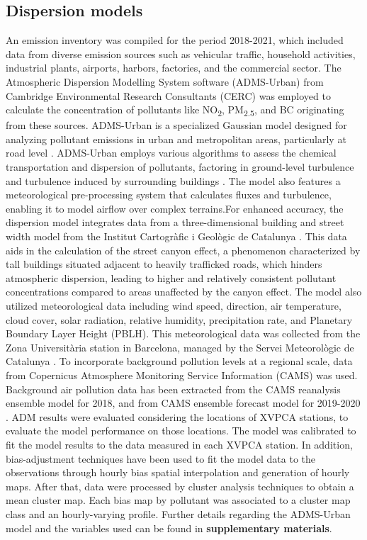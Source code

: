 \documentclass{article}
\begin{document}
\subsection{Dispersion models}

An emission inventory was compiled for the period 2018-2021, which included data from diverse emission sources such as vehicular traffic, household activities, industrial plants, airports, harbors, factories, and the commercial sector. The Atmospheric Dispersion Modelling System software (ADMS-Urban) from Cambridge Environmental Research Consultants (CERC) was employed to calculate the concentration of pollutants like NO\textsubscript{2}, PM\textsubscript{2.5}, and BC originating from these sources. ADMS-Urban is a specialized Gaussian model designed for analyzing pollutant emissions in urban and metropolitan areas, particularly at road level \cite{mchugh1997adms}. ADMS-Urban employs various algorithms to assess the chemical transportation and dispersion of pollutants, factoring in ground-level turbulence and turbulence induced by surrounding buildings \cite{stocker2012adms}. The model also features a meteorological pre-processing system that calculates fluxes and turbulence, enabling it to model airflow over complex terrains.For enhanced accuracy, the dispersion model integrates data from a three-dimensional building and street width model from the Institut Cartogràfic i Geològic de Catalunya \cite{stoter2016state, 3Dcity}. This data aids in the calculation of the street canyon effect, a phenomenon characterized by tall buildings situated adjacent to heavily trafficked roads, which hinders atmospheric dispersion, leading to higher and relatively consistent pollutant concentrations compared to areas unaffected by the canyon effect. The model also utilized meteorological data including wind speed, direction, air temperature, cloud cover, solar radiation, relative humidity, precipitation rate, and Planetary Boundary Layer Height (PBLH). This meteorological data was collected from the Zona Universitària station in Barcelona, managed by the Servei Meteorològic de Catalunya \cite{xema2013}. To incorporate background pollution levels at a regional scale, data from Copernicus Atmosphere Monitoring Service Information (CAMS) was used. Background air pollution data has been extracted from the CAMS reanalysis ensemble model for 2018, and from CAMS ensemble forecast model for 2019-2020 \cite{cams2020, franceinstitut}. ADM results were evaluated considering the locations of XVPCA stations, to evaluate the model performance on those locations. The model was calibrated to fit the model results to the data measured in each XVPCA station. In addition, bias-adjustment techniques have been used to fit the model data to the observations through hourly bias spatial interpolation and generation of hourly maps. After that, data were processed  by cluster analysis techniques to obtain a mean cluster map. Each bias map by pollutant was associated to a cluster map class and an hourly-varying profile. Further details regarding the ADMS-Urban model and the variables used can be found in \textbf{supplementary materials}.
\end{document}
